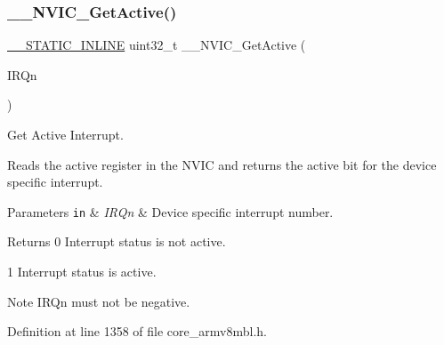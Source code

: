 \mbox{\label{group___c_m_s_i_s___core___n_v_i_c_functions_gaa2837003c28c45abf193fe5e8d27f593}} 
\subsubsection{\texorpdfstring{\+\_\+\+\_\+\+N\+V\+I\+C\+\_\+\+Get\+Active()}{\_\_NVIC\_GetActive()}}
{\footnotesize\ttfamily \hyperlink{cmsis__iccarm_8h_aba87361bfad2ae52cfe2f40c1a1dbf9c}{\+\_\+\+\_\+\+S\+T\+A\+T\+I\+C\+\_\+\+I\+N\+L\+I\+NE} uint32\+\_\+t \+\_\+\+\_\+\+N\+V\+I\+C\+\_\+\+Get\+Active (\begin{DoxyParamCaption}\item[{\hyperlink{group___c_m_s_i_s__18_x_x___i_r_q_gaa44deabd252bda567898bae35a086adc}{I\+R\+Qn\+\_\+\+Type}}]{I\+R\+Qn }\end{DoxyParamCaption})}



Get Active Interrupt. 

Reads the active register in the N\+V\+IC and returns the active bit for the device specific interrupt. 
\begin{DoxyParams}[1]{Parameters}
\mbox{\tt in}  & {\em I\+R\+Qn} & Device specific interrupt number. \\
\hline
\end{DoxyParams}
\begin{DoxyReturn}{Returns}
0 Interrupt status is not active. 

1 Interrupt status is active. 
\end{DoxyReturn}
\begin{DoxyNote}{Note}
I\+R\+Qn must not be negative. 
\end{DoxyNote}


Definition at line 1358 of file core\+\_\+armv8mbl.\+h.

\mbox{\label{group___c_m_s_i_s___core___n_v_i_c_functions_gaaeb5e7cc0eaad4e2817272e7bf742083}} 
